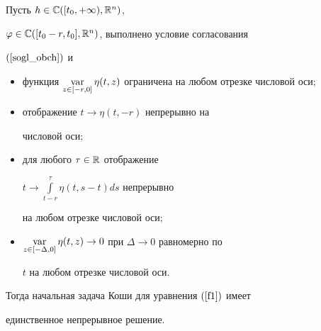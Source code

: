 \begin{thms}


Пусть $h\in\Bbb{C} ([t_{0},+\infty),\Bbb{R}^{n})$,


$\varphi \in\Bbb{C} ([t_{0}-r,t_{0}]


,\Bbb{R}^{n}) $, выполнено условие согласования


$(\ref{sogl_obch})$ и


\begin{itemize}


\item[1)] функция $\Var\limits_{z\in [-r,0] }


\eta (t,z)$ ограничена на любом отрезке числовой оси$;$


\item[2)] отображение $t \to \eta (t,-r)$ непрерывно на


числовой оси$;$


\item[3)] для любого $\tau\in\Bbb{R}$ отображение 


$t \to \int\limits_{t-r}^{\tau}\eta (t,s-t) ds$ непрерывно 


на любом отрезке числовой оси$;$


\item[4)] $\Var\limits_{z\in [-\Delta,0] }


\eta (t,z) \to 0$ при $\Delta \to 0$ равномерно по


$t$ на любом отрезке числовой оси.


\end{itemize}


Тогда начальная задача Коши для уравнения $(\ref{f1})$ имеет 


единственное непрерывное решение.


\end{thms}





